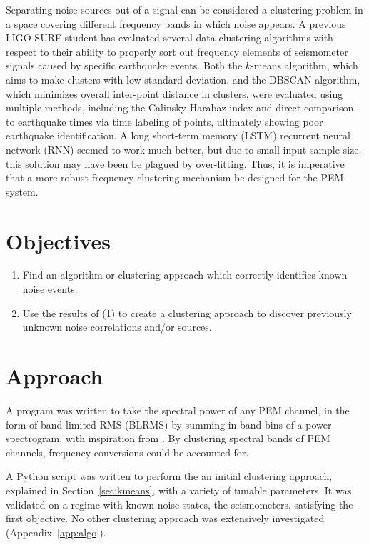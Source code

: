 \documentclass[colorlinks=true,pdfstartview=FitV,linkcolor=blue,
            citecolor=red,urlcolor=magenta]{ligodoc}
\begin{document}
Separating noise sources out of a signal can be considered a clustering problem in a space covering different frequency bands in which noise appears.
A previous LIGO SURF student has evaluated several data clustering algorithms with respect to their ability to properly sort out frequency elements of seismometer signals caused by specific earthquake events\cite{roxana}.
Both the $k$-means algorithm, which aims to make clusters with low standard deviation, and the DBSCAN algorithm, which minimizes overall inter-point distance in clusters, were evaluated using multiple methods, including the Calinsky-Harabaz  index and direct comparison to earthquake times via time labeling of points, ultimately showing poor earthquake identification.
A long short-term memory (LSTM) recurrent neural network (RNN) seemed to work much better, but due to small input sample size, this solution may have been be plagued by over-fitting.
Thus, it is imperative that a more robust frequency clustering mechanism be designed for the PEM system.

\section{Objectives}
\begin{enumerate}
\item
  Find an algorithm or clustering approach which correctly identifies known noise events.
\item
  Use the results of (1) to create a clustering approach to discover previously unknown noise correlations and/or sources.
\end{enumerate}

\section{Approach}

A program was written to take the spectral power of any PEM channel, in the form of band-limited RMS (BLRMS) by summing in-band bins of a power spectrogram, with inspiration from \cite{vajente}. By clustering spectral bands of PEM channels, frequency conversions could be accounted for.

A Python script was written to perform the an initial clustering approach, explained in Section~\ref{sec:kmeans}, with a variety of tunable parameters. It was validated on a regime with known noise states, the seismometers, satisfying the first objective. No other clustering approach was extensively investigated (Appendix~\ref{app:algo}).
\end{document}
